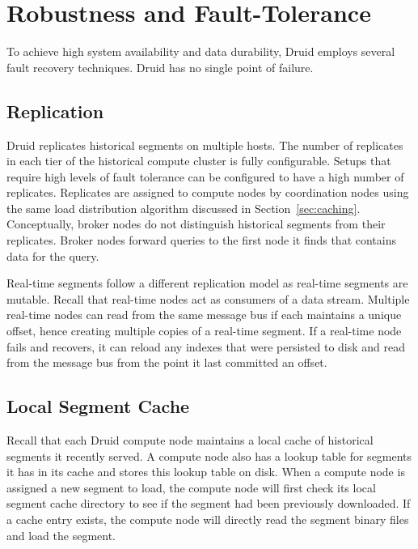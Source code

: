 \documentclass{vldb}
\begin{document}
\section{Robustness and Fault-Tolerance}
\label{sec:robustness}
To achieve high system availability and data durability, Druid employs
several fault recovery techniques. Druid has no single point of
failure.

\subsection{Replication}
Druid replicates historical segments on multiple hosts. The number of
replicates in each tier of the historical compute cluster is fully
configurable. Setups that require high levels of fault tolerance can
be configured to have a high number of replicates. Replicates are
assigned to compute nodes by coordination nodes using the same load
distribution algorithm discussed in Section~\ref{sec:caching}. Conceptually,
broker nodes do not distinguish historical segments from their
replicates. Broker nodes forward queries to the first node it finds
that contains data for the query.

Real-time segments follow a different replication model as real-time
segments are mutable. Recall that real-time nodes act as consumers of
a data stream. Multiple real-time nodes can read from the same message
bus if each maintains a unique offset, hence creating multiple copies
of a real-time segment. If a real-time node fails and recovers, it can
reload any indexes that were persisted to disk and read from the
message bus from the point it last committed an offset.

\subsection{Local Segment Cache}
Recall that each Druid compute node maintains a local cache of
historical segments it recently served. A compute node also has a
lookup table for segments it has in its cache and stores this lookup
table on disk. When a compute node is assigned a new segment to load,
the compute node will first check its local segment cache directory to
see if the segment had been previously downloaded. If a cache entry
exists, the compute node will directly read the segment binary files
and load the segment.
\end{document}
